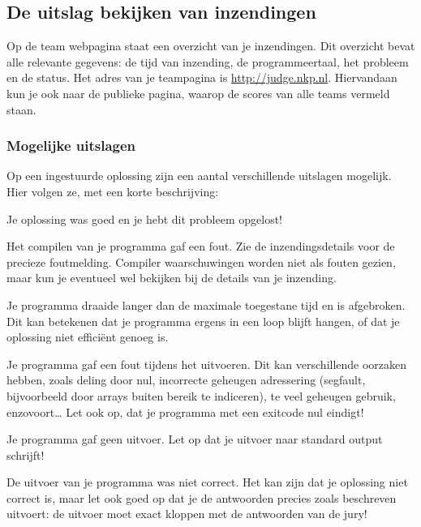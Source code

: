 \documentclass[11pt,titlepage,a4paper]{article}
\begin{document}
\subsection{De uitslag bekijken van inzendingen}

Op de team webpagina staat een overzicht van je inzendingen.
Dit overzicht bevat alle relevante gegevens: de tijd van inzending, de
programmeertaal, het probleem en de status. Het adres van je
teampagina is \url{http://judge.nkp.nl}. Hiervandaan kun je ook naar
de publieke pagina, waarop de scores van alle teams vermeld staan.

\subsubsection{Mogelijke uitslagen}

Op een ingestuurde oplossing zijn een aantal verschillende uitslagen
mogelijk. Hier volgen ze, met een korte beschrijving:

\begin{description}[\setleftmargin{4.5cm}]
\item[CORRECT]
Je oplossing was goed en je hebt dit probleem opgelost!

\item[COMPILER-ERROR]
Het compilen van je programma gaf een fout. Zie de inzendingsdetails
voor de precieze foutmelding. Compiler waarschuwingen worden niet als
fouten gezien, maar kun je eventueel wel bekijken bij de details van
je inzending.

\item[TIMELIMIT]
Je programma draaide langer dan de maximale toegestane tijd en is
afgebroken. Dit kan betekenen dat je programma ergens in een loop
blijft hangen, of dat je oplossing niet effici\"ent genoeg is.

\item[RUN-ERROR]
Je programma gaf een fout tijdens het uitvoeren. Dit kan verschillende
oorzaken hebben, zoals deling door nul, incorrecte geheugen adressering
(segfault, bijvoorbeeld door arrays buiten bereik te indiceren), te
veel geheugen gebruik, enzovoort\dots
Let ook op, dat je programma met een exitcode nul eindigt!

\item[NO-OUTPUT]
Je programma gaf geen uitvoer. Let op dat je uitvoer naar standard
output schrijft!

\item[WRONG-ANSWER]
De uitvoer van je programma was niet correct. Het kan zijn dat je
oplossing niet correct is, maar let ook goed op dat je de antwoorden
precies zoals beschreven uitvoert: de uitvoer moet exact kloppen met
de antwoorden van de jury!

\end{description}
\end{document}

